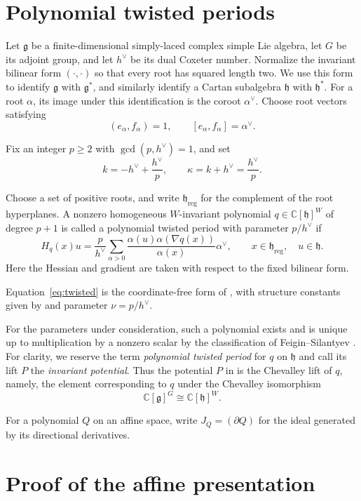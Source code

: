 \documentclass[11pt,reqno]{amsart}
\theoremstyle{remark}
\newcommand{\g}{\mathfrak g}
\newcommand{\h}{\mathfrak h}
\newcommand{\C}{\mathbb C}
\newcommand{\grad}{\nabla}
\begin{document}
\section{Polynomial twisted periods}\label{sec:periods}

Let $\g$ be a finite-dimensional simply-laced complex simple Lie
algebra, let $G$ be its adjoint group, and let $h^\vee$ be its dual
Coxeter number. Normalize the invariant bilinear form
$(\cdot,\cdot)$ so that every root has squared length two. We use this
form to identify $\g$ with $\g^*$, and similarly identify a Cartan
subalgebra $\h$ with $\h^*$. For a root $\alpha$, its image under this identification is the
coroot $\alpha^\vee$. Choose
root vectors satisfying
\[
(e_\alpha,f_\alpha)=1,
\qquad
[e_\alpha,f_\alpha]=\alpha^\vee.
\]

Fix an integer $p\geq2$ with $\gcd(p,h^\vee)=1$, and set
\[
k=-h^\vee+\frac{h^\vee}{p},
\qquad
\kappa=k+h^\vee=\frac{h^\vee}{p}.
\]

Choose a set of positive roots, and write
$\h_{\mathrm{reg}}$ for the complement of the root hyperplanes. A
nonzero homogeneous $W$-invariant polynomial
$q\in\C[\h]^W$ of degree $p+1$ is called a polynomial twisted period
with parameter $p/h^\vee$ if
\begin{equation}
\label{eq:twisted}
H_q(x)u
=
\frac{p}{h^\vee}
\sum_{\alpha>0}
\frac{\alpha(u)\alpha(\grad q(x))}{\alpha(x)}
\alpha^\vee,
\qquad
x\in\h_{\mathrm{reg}},\quad u\in\h.
\end{equation}
Here the Hessian and gradient are taken with respect to the fixed
bilinear form.

Equation~\eqref{eq:twisted} is the coordinate-free form of
\cite[Equation~(2.3)]{FS}, with structure constants given by
\cite[Equation~(2.1)]{FS} and parameter $\nu=p/h^\vee$.

For the parameters under consideration, such a polynomial exists and
is unique up to multiplication by a nonzero scalar by the
classification of Feigin--Silantyev \cite[Theorem~4.8]{FS}. For
clarity, we reserve the term \emph{polynomial twisted period} for $q$
on $\h$ and call its lift $P$ the \emph{invariant potential}. Thus the
potential $P$ in  is the Chevalley lift of $q$, namely,
the element corresponding to $q$ under the Chevalley isomorphism
\[
\C[\g]^G\cong\C[\h]^W.
\]

For a polynomial $Q$ on an affine space, write $J_Q=(\partial Q)$ for
the ideal generated by its directional derivatives.

\section{Proof of the affine presentation}\label{sec:affine}
\end{document}
